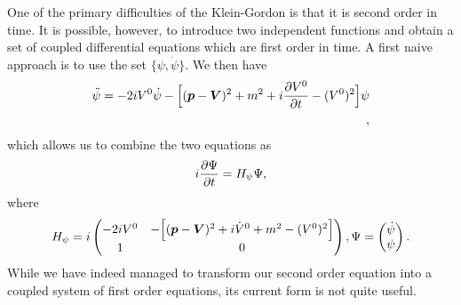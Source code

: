 One of the primary difficulties of the Klein-Gordon is that it is second order in time.
It is possible, however, to introduce two independent functions and obtain a set of coupled differential equations which are first order in time.
A first naive approach is to use the set $\{ \psi,\dot{\psi} \}$.
We then have
\begin{align}
    \ddot{\psi} = - 2 i V^{0} \dot{\psi} - \Big[ (\vb*{p} - \vb*{V})^2 + m^2 + i \pdv{V^{0}}{t} - (V^{0})^2 \Big] \psi \\
,\end{align}
which allows us to combine the two equations as
\begin{align}
    i \pdv{\Psi}{t} = H_{\psi} \Psi
,\end{align}
where
\begin{align}
    H_{\psi} = i
    \begin{pmatrix}
        -2 i V^{0} & - \Big[ (\vb*{p} - \vb*{V})^2 + i \dot{V}^{0} + m^2 - (V^{0})^2 \Big] \\
        1 & 0
    \end{pmatrix},
    \Psi = 
    \begin{pmatrix}
        \dot{\psi} \\ \psi
    \end{pmatrix}    
.\end{align}
While we have indeed managed to transform our second order equation into a coupled system of first order equations, its current form is not quite useful.

